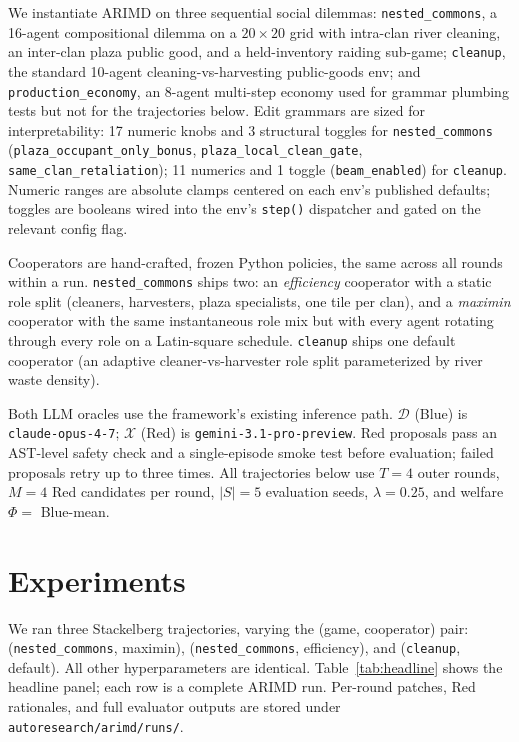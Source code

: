 \documentclass[11pt]{article}
\newcommand{\Welfare}{\Phi}
\begin{document}
We instantiate ARIMD on three sequential social dilemmas:
\texttt{nested\_commons}, a 16-agent compositional dilemma on a
$20{\times}20$ grid with intra-clan river cleaning, an inter-clan
plaza public good, and a held-inventory raiding sub-game;
\texttt{cleanup}, the standard 10-agent cleaning-vs-harvesting
public-goods env; and \texttt{production\_economy}, an 8-agent
multi-step economy used for grammar plumbing tests but not for the
trajectories below.  Edit grammars are sized for interpretability:
17 numeric knobs and 3 structural toggles for
\texttt{nested\_commons} (\texttt{plaza\_occupant\_only\_bonus},
\texttt{plaza\_local\_clean\_gate}, \texttt{same\_clan\_retaliation});
11 numerics and 1 toggle (\texttt{beam\_enabled}) for
\texttt{cleanup}.  Numeric ranges are absolute clamps centered on
each env's published defaults; toggles are booleans wired into the
env's \texttt{step()} dispatcher and gated on the relevant
config flag.

Cooperators are hand-crafted, frozen Python policies, the same
across all rounds within a run.  \texttt{nested\_commons} ships
two: an \emph{efficiency} cooperator with a static role split
(cleaners, harvesters, plaza specialists, one tile per clan), and
a \emph{maximin} cooperator with the same instantaneous role mix
but with every agent rotating through every role on a Latin-square
schedule.  \texttt{cleanup} ships one default cooperator (an
adaptive cleaner-vs-harvester role split parameterized by river
waste density).

Both LLM oracles use the framework's existing inference path.
$\mathcal{D}$ (Blue) is \texttt{claude-opus-4-7};
$\mathcal{X}$ (Red) is \texttt{gemini-3.1-pro-preview}.  Red
proposals pass an AST-level safety check and a single-episode
smoke test before evaluation; failed proposals retry up to three
times.  All trajectories below use $T = 4$ outer rounds, $M = 4$
Red candidates per round, $|S| = 5$ evaluation seeds, $\lambda =
0.25$, and welfare $\Welfare = $ Blue-mean.

\section{Experiments}
\label{sec:experiments}

We ran three Stackelberg trajectories, varying the (game,
cooperator) pair: (\texttt{nested\_commons}, maximin),
(\texttt{nested\_commons}, efficiency), and (\texttt{cleanup},
default).  All other hyperparameters are identical.
Table~\ref{tab:headline} shows the headline panel; each row is a
complete ARIMD run.  Per-round patches, Red rationales, and
full evaluator outputs are stored under
\texttt{autoresearch/arimd/runs/}.
\end{document}
